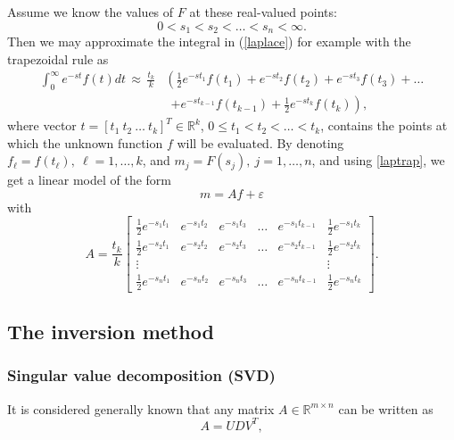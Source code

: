 \documentclass[12pt,a4]{article}
\newcommand{\R}{{\mathbb R}}
\begin{document}
Assume we know the values of $F$ at these real-valued points:
$$
 0<s_1<s_2<\ldots <s_n<\infty.
$$ 
Then we may approximate the integral in (\ref{laplace}) for example with the trapezoidal rule as
\begin{equation} \label{laptrap}
\begin{split}
 \int_0^\infty e^{-st}f(t)dt\, \approx\, \frac{t_k}{k} & \left( \frac{1}{2}e^{-st_1}f(t_1)+e^{-st_2}f(t_2)+e^{-st_3}f(t_3)+\ldots\right.\\   &\ \ \left. +e^{-st_{k-1}}f(t_{k-1})+\frac{1}{2}e^{-st_k}f(t_k)\right) ,
\end{split}
\end{equation}
where vector $t=[t_1\ t_2\ \ldots\ t_k]^T\in\R^k$, $0\leq t_1<t_2<\ldots <t_k$, contains the points at which the unknown function $f$ will be evaluated. By denoting $f_\ell=f(t_\ell), \ \ell=1,\ldots ,k$, and $m_j=F(s_j),\ j=1,\ldots ,n$, and using \eqref{laptrap}, we get a linear model of the form 
\begin{equation}\label{linearModel}
m=Af+\varepsilon
\end{equation}
with
\begin{equation}\label{LaplaceA} 
A = \frac{t_k}{k}\begin{bmatrix} \frac{1}{2}e^{-s_1t_1} & e^{-s_1t_2} & e^{-s_1t_3} & \ldots & e^{-s_1t_{k-1}} & \frac{1}{2}e^{-s_1t_k} \\
                       \frac{1}{2}e^{-s_2t_1} & e^{-s_2t_2} & e^{-s_2t_3} & \ldots & e^{-s_2t_{k-1}} & \frac{1}{2}e^{-s_2t_k} \\
                       \vdots & & & & & \vdots \\
                       \frac{1}{2}e^{-s_nt_1} & e^{-s_nt_2} & e^{-s_nt_3} & \ldots & e^{-s_nt_{k-1}} & \frac{1}{2}e^{-s_nt_k} \end{bmatrix}.
\end{equation}


\subsection{The inversion method}


\subsubsection{Singular value decomposition (SVD)}\label{SVDsec}
It is considered generally known that any matrix  $A \in \R^{m \times n}$ can be written as
\begin{equation}\label{SVD}
A = UDV^T,
\end{equation}
\end{document}
